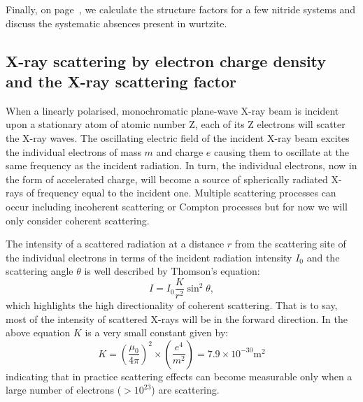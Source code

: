  Finally, on page~\pageref{sec:SF_GAN}, we calculate the structure factors for a few nitride systems and discuss the systematic absences present in wurtzite. 





\subsection{X-ray scattering by electron charge density and the X-ray scattering factor}

When a linearly polarised, monochromatic plane-wave X-ray beam is incident upon a stationary atom of atomic number Z, each of its Z electrons will scatter the X-ray waves. The oscillating electric field of the incident X-ray beam excites the individual electrons of mass $m$ and charge $e$ causing them to oscillate at the same frequency as the incident radiation. In turn, the individual electrons, now in the form of accelerated charge, will become a source of spherically radiated X-rays of frequency equal to the incident one. Multiple scattering processes can occur including incoherent scattering or Compton processes but for now we will only consider coherent scattering.


The intensity of a scattered radiation at a distance $r$ from the scattering site of the individual electrons in terms of the incident radiation intensity $I_0$ and the scattering angle $\theta$ is well described by Thomson's equation:
\begin{equation}
I = I_0 \frac{K}{r^2}\sin^2 {\theta},
\end{equation}
which highlights the high directionality of coherent scattering. That is to say, most of the intensity of scattered X-rays will be in the forward direction. In the above equation $K$ is a very small constant given by:
\begin{equation*}
K = \left( \frac{\mu_0}{4 \pi} \right)^2 \times \left( \frac{e^4}{m^2} \right) = 7.9 \times 10^{-30} \si{\meter}^2
\end{equation*}
indicating that in practice scattering effects can become measurable only when a large number of electrons ($ > 10^{23}$) are scattering.

